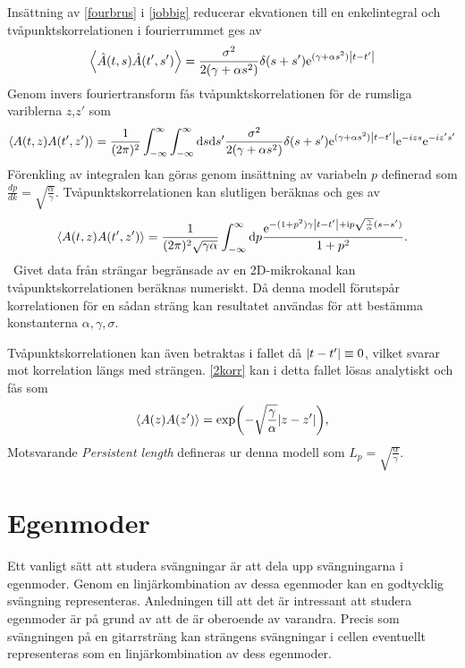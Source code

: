 Insättning av \eqref{fourbrus} i \eqref{jobbig} reducerar ekvationen till en enkelintegral och tvåpunktskorrelationen i fourierrummet ges av
\begin{equation}
    \ev{\hat{A}(t,s)\hat{A}(t',s')}=\frac{\sigma^2}{2(\gamma+\alpha s^2)}\delta(s+s')\ee^{(\gamma+\alpha s^2)\abs{t-t'}}
\end{equation}
Genom invers fouriertransform fås tvåpunktskorrelationen för de rumsliga variblerna $z$,$z'$ som
\begin{equation}
    \ev{A(t,z)A(t',z')}=\frac{1}{(2\pi)^2}\int_{-\infty}^{\infty}\int_{-\infty}^{\infty}\dd s \dd s'\frac{\sigma^2}{2(\gamma+\alpha s^2)}\delta(s+s')\ee^{(\gamma+\alpha s^2)\abs{t-t'}}\ee^{-izs}\ee^{-iz's'}
\end{equation}
Förenkling av integralen kan göras genom insättning av variabeln $p$ definerad som $\frac{dp}{dk}=\sqrt{\frac{\alpha}{\gamma}}$. Tvåpunktskorrelationen kan slutligen beräknas och ges av 
\begin{equation}
\label{2korr}
    \ev{A(t,z)A(t',z')}=\frac{1}{(2\pi)^2\sqrt{\gamma\alpha}}\int_{-\infty}^{\infty}\dd p \frac{\ee^{-(1+p^2)\gamma \abs{t-t'}+\ii p\sqrt{\frac{\gamma}{\alpha}}(s-s')}}{1+p^2}.
\end{equation}
\
Givet data från strängar begränsade av en 2D-mikrokanal kan tvåpunktskorrelationen beräknas numeriskt. Då denna modell förutspår korrelationen för en sådan sträng kan resultatet användas för att bestämma konstanterna $\alpha,\gamma,\sigma$. 

Tvåpunktskorrelationen kan även betraktas i fallet då $\abs{t-t'}\equiv 0$, vilket svarar mot korrelation längs med strängen. \eqref{2korr} kan i detta fallet lösas analytiskt och fås som
\begin{equation}
\ev{A(z)A(z')}=\exp(-\sqrt{\frac{\gamma}{\alpha}}\abs{z-z'}),
\end{equation}
Motsvarande \emph{Persistent length} defineras ur denna modell som $L_{p}=\sqrt{\frac{\alpha}{\gamma}}$.


\section{Egenmoder}
Ett vanligt sätt att studera svängningar är att dela upp svängningarna i egenmoder. Genom en linjärkombination av dessa egenmoder kan en godtycklig svängning representeras. Anledningen till att det är intressant att studera egenmoder är på grund av att de är oberoende av varandra. Precis som  svängningen på en gitarrsträng kan strängens svängningar i cellen eventuellt representeras som en linjärkombination av dess egenmoder. 

